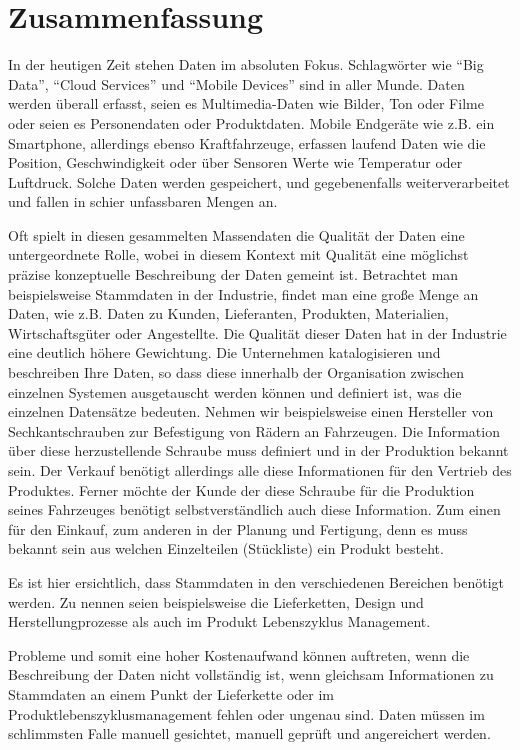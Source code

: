 \chapter*{Zusammenfassung}


In der heutigen Zeit stehen Daten im absoluten Fokus. Schlagwörter wie \enquote{Big Data}, \enquote{Cloud Services} und \enquote{Mobile Devices} sind in aller Munde. Daten werden überall erfasst, seien es Multimedia-Daten wie Bilder, Ton oder Filme oder seien es Personendaten oder Produktdaten. Mobile Endgeräte wie z.B. ein Smartphone, allerdings ebenso Kraftfahrzeuge, erfassen laufend Daten wie die Position, Geschwindigkeit oder über Sensoren Werte wie Temperatur oder Luftdruck. Solche Daten werden gespeichert, und gegebenenfalls weiterverarbeitet und fallen in schier unfassbaren Mengen an. 

Oft spielt in diesen gesammelten Massendaten die Qualität der Daten eine untergeordnete Rolle, wobei in diesem Kontext mit Qualität eine möglichst präzise konzeptuelle Beschreibung der Daten gemeint ist.  
Betrachtet man beispielsweise Stammdaten in der Industrie, findet man eine große Menge an Daten, wie z.B. Daten zu Kunden, Lieferanten, Produkten, Materialien, Wirtschaftsgüter oder Angestellte. Die Qualität dieser Daten hat in der Industrie eine deutlich höhere Gewichtung. Die Unternehmen katalogisieren und beschreiben Ihre Daten, so dass diese innerhalb der Organisation zwischen einzelnen Systemen ausgetauscht werden können und definiert ist, was die einzelnen Datensätze bedeuten. Nehmen wir beispielsweise einen Hersteller von Sechkantschrauben zur Befestigung von Rädern an Fahrzeugen. Die Information über diese herzustellende Schraube muss definiert und in der Produktion bekannt sein. Der Verkauf benötigt allerdings alle diese Informationen für den Vertrieb des Produktes. Ferner möchte der Kunde der diese Schraube für die Produktion seines Fahrzeuges benötigt selbstverständlich auch diese Information. Zum einen für den Einkauf, zum anderen in der Planung und Fertigung, denn es muss bekannt sein aus welchen Einzelteilen (Stückliste) ein Produkt besteht. 

Es ist hier ersichtlich, dass Stammdaten in den verschiedenen Bereichen benötigt werden. Zu nennen seien beispielsweise die Lieferketten, Design und Herstellungprozesse als auch im Produkt Lebenszyklus Management.     

Probleme und somit eine hoher Kostenaufwand können auftreten, wenn die Beschreibung der Daten nicht vollständig ist, wenn gleichsam Informationen zu Stammdaten an einem Punkt der Lieferkette oder im Produktlebenszyklusmanagement fehlen oder ungenau sind. Daten müssen im schlimmsten Falle manuell gesichtet, manuell geprüft und angereichert werden.  

